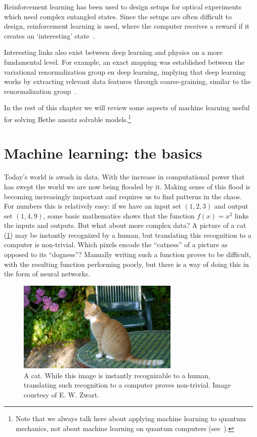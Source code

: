 \documentclass[11pt, a4paper]{report} %
\begin{document}
Reinforcement learning has been used to design setups for optical experiments which need complex entangled states.
Since the setups are often difficult to design, reinforcement learning is used, where the computer receives a reward if it creates an `interesting' state~\cite{Dunjko2017}.

Interesting links also exist between deep learning and physics on a more fundamental level.
For example, an exact mapping was established between the variational renormalization group en deep learning, implying that deep learning works by extracting relevant data features through coarse-graining, similar to the renormalization group~\cite{Mehta2014}. 

In the rest of this chapter we will review some aspects of machine learning useful for solving Bethe ansatz solvable models.\footnote{Note that we always talk here about applying machine learning to quantum mechanics, not about machine learning on quantum computers (see~\cite{Dunjko2017}).}


\section{Machine learning: the basics}
Today's world is awash in data.
With the increase in computational power that has swept the world we are now being flooded by it.
Making sense of this flood is becoming increasingly important and requires us to find patterns in the chaos.
For numbers this is relatively easy: if we have an input set \((1,2,3)\) and output set \((1,4,9)\), some basic mathematics shows that the function \(f(x)=x^2\) links the inputs and outputs.
But what about more complex data?
A picture of a cat (\cref{fig:cat}) may be instantly recognized by a human, but translating this recognition to a computer is non-trivial.
Which pixels encode the ``catness'' of a picture as opposed to its ``dogness''?
Manually writing such a function proves to be difficult, with the resulting function performing poorly, but there is a way of doing this in the form of neural networks. 

\begin{figure}[tb!]
  \centering
  \includegraphics[width=0.7\textwidth]{cat.jpg}
  \caption{A cat. While this image is instantly recognizable to a human, translating such recognition to a computer proves non-trivial. Image courtesy of E. W. Zwart.}\label{fig:cat}
\end{figure}
\end{document}

